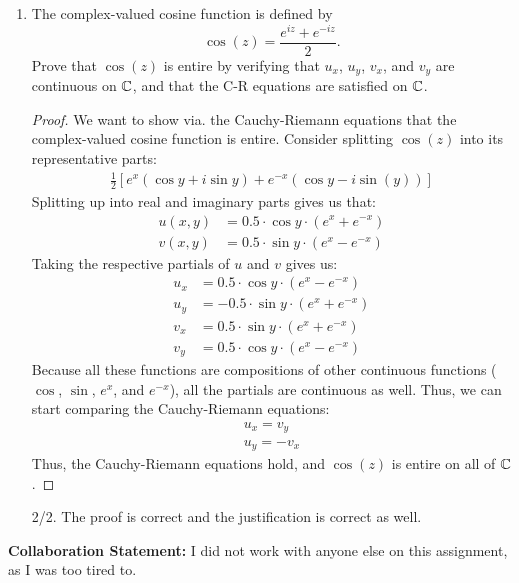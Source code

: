 \begin{enumerate}
\item The complex-valued cosine function is defined by
	\[\cos(z) = \frac{e^{iz} + e^{-iz}}{2}. \]
Prove that $\cos(z)$ is entire by verifying that $u_x$, $u_y$, $v_x$, and $v_y$ are continuous on $\mathbb{C}$, and that the C-R equations are satisfied on $\mathbb{C}$.
\begin{proof}
	We want to show via. the Cauchy-Riemann equations that the complex-valued cosine function is entire.\gline{}
	Consider splitting $\cos(z)$ into its representative parts:
	\begin{align*}
		\frac{1}2\left[e^x(\cos y + i\sin y) + e^{-x}(\cos y - i\sin(y))\right]
	\end{align*}
	Splitting up into real and imaginary parts gives us that:
	\begin{align*}
		u(x,y) &= 0.5\cdot\cos y\cdot(e^x + e^{-x})\\
		v(x,y) &= 0.5\cdot\sin y\cdot(e^x - e^{-x})
	\end{align*}
	Taking the respective partials of $u$ and $v$ gives us:
	\begin{align*}
		u_x &= 0.5\cdot\cos y \cdot (e^x-e^{-x})\\
		u_y &= -0.5\cdot\sin y \cdot(e^x + e^{-x})\\
		v_x &= 0.5\cdot\sin y \cdot(e^x + e^{-x})\\
		v_y &= 0.5\cdot\cos y \cdot (e^x - e^{-x})
	\end{align*}
	Because all these functions are compositions of other continuous functions ($\cos$, $\sin$, $e^{x}$, and $e^{-x}$), all the partials are continuous as well. Thus, we can start comparing the Cauchy-Riemann equations:
	\begin{align*}
		u_x = v_y\\
		u_y = -v_x
	\end{align*}
	Thus, the Cauchy-Riemann equations hold, and $\cos(z)$ is entire on all of $\mathbb{C}$. 
\end{proof}
\begin{grade}
	2/2. The proof is correct and the justification is correct as well. 
\end{grade}
\end{enumerate}

\begin{reflection}
	\textbf{Collaboration Statement:} I did not work with anyone else on this assignment, as I was too tired to. 
\end{reflection}



